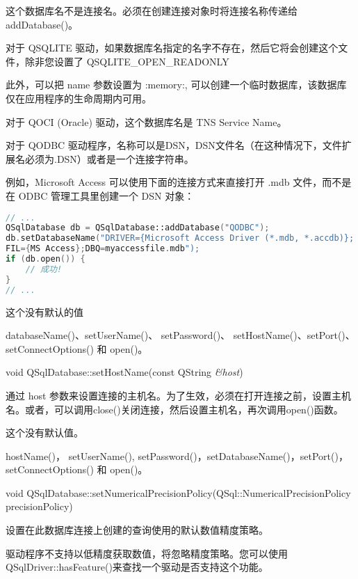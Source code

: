\begin{notice}
这个数据库名不是连接名。必须在创建连接对象时将连接名称传递给 addDatabase()。
\end{notice}


对于 QSQLITE 驱动，如果数据库名指定的名字不存在，然后它将会创建这个文件，除非您设置了 QSQLITE\_OPEN\_READONLY

此外，可以把 name 参数设置为 :memory:, 可以创建一个临时数据库，该数据库仅在应用程序的生命周期内可用。

对于 QOCI (Oracle) 驱动，这个数据库名是 TNS Service Name。

对于 QODBC 驱动程序，名称可以是DSN，DSN文件名（在这种情况下，文件扩展名必须为.DSN）或者是一个连接字符串。

例如，Microsoft Access 可以使用下面的连接方式来直接打开 .mdb 文件，而不是在 ODBC 管理工具里创建一个 DSN 对象：

\clearpage

\begin{lstlisting}[language=C++]
// ...
QSqlDatabase db = QSqlDatabase::addDatabase("QODBC");
db.setDatabaseName("DRIVER={Microsoft Access Driver (*.mdb, *.accdb)};
FIL={MS Access};DBQ=myaccessfile.mdb");
if (db.open()) {
	// 成功!
}
// ...
\end{lstlisting}

这个没有默认的值

\begin{seeAlso}
databaseName()、setUserName()、 setPassword()、 setHostName()、setPort()、setConnectOptions() 和 open()。
\end{seeAlso}


void QSqlDatabase::setHostName(const QString \emph{\&host})

通过 host 参数来设置连接的主机名。为了生效，必须在打开连接之前，设置主机名。或者，可以调用close()关闭连接，然后设置主机名，再次调用open()函数。

这个没有默认值。




\begin{seeAlso}
hostName()， setUserName(), setPassword()，setDatabaseName()，setPort()， setConnectOptions() 和 open()。
\end{seeAlso}


void QSqlDatabase::setNumericalPrecisionPolicy(QSql::NumericalPrecisionPolicy precisionPolicy)


设置在此数据库连接上创建的查询使用的默认数值精度策略。

\begin{notice}
驱动程序不支持以低精度获取数值，将忽略精度策略。您可以使用 QSqlDriver::hasFeature()来查找一个驱动是否支持这个功能。
\end{notice}

